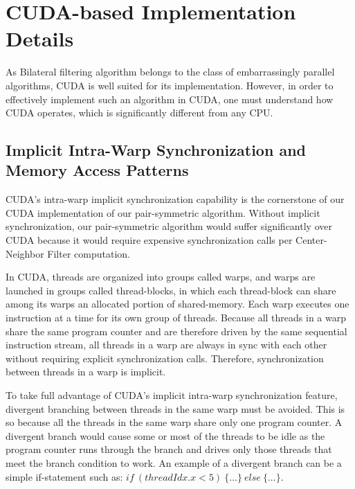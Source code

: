 \documentclass{IEEEtran}
\begin{document}
\section{CUDA-based Implementation Details}
\label{sec:GPUoptimizations} 
As Bilateral filtering algorithm belongs to the class of embarrassingly parallel algorithms, CUDA is well suited for its implementation. However,
in order to effectively implement such an algorithm in CUDA, one must understand how CUDA operates, which is significantly different from any CPU.

\subsection{Implicit Intra-Warp Synchronization and Memory Access Patterns}

CUDA's intra-warp implicit synchronization capability is the cornerstone of our CUDA implementation of our pair-symmetric algorithm. Without implicit synchronization, our pair-symmetric algorithm would suffer significantly over CUDA because it would require expensive synchronization calls per Center-Neighbor Filter computation.

In CUDA, threads are organized into groups called warps, and warps are launched in groups called thread-blocks, in which each thread-block can share among its warps an allocated portion of shared-memory. Each warp executes one instruction at a time for its own group of threads. Because all threads in a warp share the same program counter and are therefore driven by the same sequential instruction stream, all threads in a warp are always in sync with each other without requiring explicit synchronization calls. Therefore, synchronization between threads in a warp is implicit.

To take full advantage of CUDA's implicit intra-warp synchronization feature, divergent branching between threads in the same warp must be avoided. This is so because all the threads in the same warp share only one program counter. A divergent branch would cause some or most of the threads to be idle as the program counter runs through the branch and drives only those threads that meet the branch condition to work. An example of a divergent branch can be a simple if-statement such as: $if~(threadIdx.x < 5)~\{...\}~else~\{...\}$.
\end{document}
